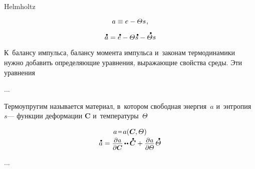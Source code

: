 Helmholtz 

\nopagebreak\vspace{-0.33em}\begin{equation}\label{helmholtzfreeenergy.permassunit}
a \equiv e - \varTheta s
\hspace{.15ex} ,
\end{equation}

\[
\mathdotabove{a} = \mathdotabove{e} - \temperaturefield \mathdotabove{s} - \mathdotabove{\temperaturefield} s
\]



\begin{otherlanguage}{russian}

К~балансу импульса, балансу момента импульса и~законам термодинамики нужно добавить определяющие уравнения, выражающие свойства среды. Эти уравнения

...

Термоупругим называется материал, в~котором свободная энергия~$a$ и~энтропия~$s$\:--- функции деформации $\bm{C}$ и~температуры~$\varTheta$

\nopagebreak\vspace{-0.1em}\begin{equation*}\begin{array}{c}
a \narroweq a(\bm{C} \hspace{-0.1ex} , \temperaturefield)
\\[.2em]
%
\mathdotabove{a}
= \scalebox{0.92}[0.92]{$ \displaystyle \frac{\raisemath{-0.2em}{\partial\hspace{.1ex} a}}{\partial \bm{C}}$}
\hspace{-0.15ex} \dotdotp \hspace{-0.1ex} \mathdotabove{\bm{C}}
+ \scalebox{0.92}[0.92]{$ \displaystyle \frac{\raisemath{-0.2em}{\partial\hspace{.1ex} a}}{\partial \temperaturefield}$}
\hspace{.2ex} \mathdotabove{\temperaturefield}
\end{array}\end{equation*}

...

\end{otherlanguage}

